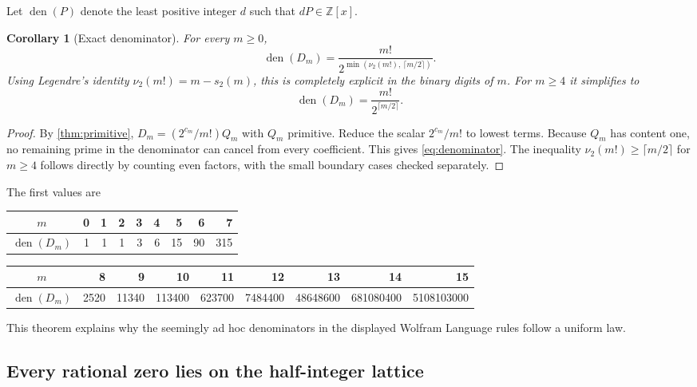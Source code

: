 \documentclass[11pt,oneside]{article}
\newtheorem{corollary}[theorem]{Corollary}
\theoremstyle{definition}
\theoremstyle{remark}
\newcommand{\Z}{\mathbb Z}
\newcommand{\Diag}{D}
\newcommand{\vtwo}{\nu_{2}}
\newcommand{\bitsum}{s_{2}}
\begin{document}
Let $\operatorname{den}(P)$ denote the least positive integer $d$ such that
$dP\in\Z[x]$.

\begin{corollary}[Exact denominator]
\label{cor:denominator}
For every $m\ge0$,
\begin{equation}
 \boxed{\quad
 \operatorname{den}(\Diag_m)
 =\frac{m!}{2^{\min(\vtwo(m!),\,\lceil m/2\rceil)}}.
 \quad}
 \label{eq:denominator}
\end{equation}
Using Legendre's identity $\vtwo(m!)=m-\bitsum(m)$, this is completely
explicit in the binary digits of $m$.  For $m\ge4$ it simplifies to
\begin{equation}
 \operatorname{den}(\Diag_m)=\frac{m!}{2^{\lceil m/2\rceil}}.
 \label{eq:denominator-large}
\end{equation}
\end{corollary}

\begin{proof}
By \cref{thm:primitive},
$\Diag_m=(2^{c_m}/m!)Q_m$ with $Q_m$ primitive.  Reduce the scalar
$2^{c_m}/m!$ to lowest terms.  Because $Q_m$ has content one, no remaining
prime in the denominator can cancel from every coefficient.  This gives
\eqref{eq:denominator}.  The inequality
$\vtwo(m!)\ge\lceil m/2\rceil$ for $m\ge4$ follows directly by counting even
factors, with the small boundary cases checked separately.
\end{proof}

The first values are
\begin{center}
\small
\begin{tabular}{c|rrrrrrrr}
\toprule
$m$&0&1&2&3&4&5&6&7\\
\midrule
$\operatorname{den}(\Diag_m)$&1&1&1&3&6&15&90&315\\
\bottomrule
\end{tabular}

\medskip
\begin{tabular}{c|rrrrrrrr}
\toprule
$m$&8&9&10&11&12&13&14&15\\
\midrule
$\operatorname{den}(\Diag_m)$
&2520&11340&113400&623700&7484400&48648600&681080400&5108103000\\
\bottomrule
\end{tabular}
\end{center}
This theorem explains why the seemingly ad hoc denominators in the displayed
Wolfram Language rules follow a uniform law.

\subsection{Every rational zero lies on the half-integer lattice}
\end{document}
